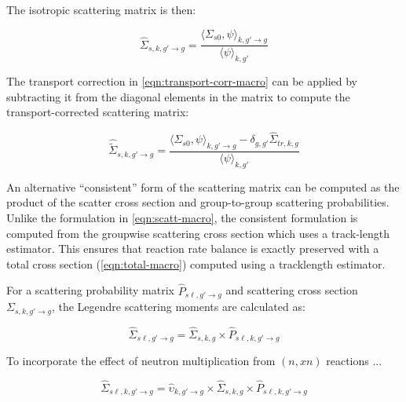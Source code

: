 \noindent The isotropic scattering matrix is then:

\begin{equation}
\label{eqn:scatt-macro}
\hat{\Sigma}_{s,k,g'\rightarrow g} = \frac{\langle \Sigma_{s0}, \psi \rangle_{k,g'\rightarrow g}}{\langle \psi \rangle_{k,g'}}
\end{equation}

\noindent The transport correction in \autoref{eqn:transport-corr-macro} can be applied by subtracting it from the diagonal elements in the matrix to compute the transport-corrected scattering matrix:

\begin{equation}
\label{eqn:scatt-trans-macro}
\hat{\tilde{\Sigma}}_{s,k,g'\rightarrow g} = \frac{\langle \Sigma_{s0}, \psi \rangle_{k,g'\rightarrow g} - \delta_{g,g'} \hat{\Sigma}_{tr,k,g}}{\langle \psi \rangle_{k,g'}}
\end{equation}


An alternative ``consistent'' form of the scattering matrix can be computed as the product of the scatter cross section and group-to-group scattering probabilities. Unlike the formulation in \autoref{eqn:scatt-macro}, the consistent formulation is computed from the groupwise scattering cross section which uses a track-length estimator. This ensures that reaction rate balance is exactly preserved with a total cross section (\autoref{eqn:total-macro}) computed using a tracklength estimator.

For a scattering probability matrix $\hat{P}_{s\ell,g'\rightarrow g}$ and scattering cross section $\Sigma_{s,k,g'\rightarrow g}$, the Legendre scattering moments are calculated as:

\begin{equation}
\label{eqn:scatt-mat-consistent}
\hat{\Sigma}_{s\ell,g'\rightarrow g} = \hat{\Sigma}_{s,k,g} \times \hat{P}_{s\ell,k,g'\rightarrow g}
\end{equation}

To incorporate the effect of neutron multiplication from $(n,xn)$ reactions ...

\begin{equation}
\label{eqn:nuscatt-mat-consistent}
\hat{\Sigma}_{s\ell,k,g'\rightarrow g} = \hat{\upsilon}_{k,g'\rightarrow g} \times \hat{\Sigma}_{s,k,g} \times \hat{P}_{s\ell,k,g'\rightarrow g}
\end{equation}

